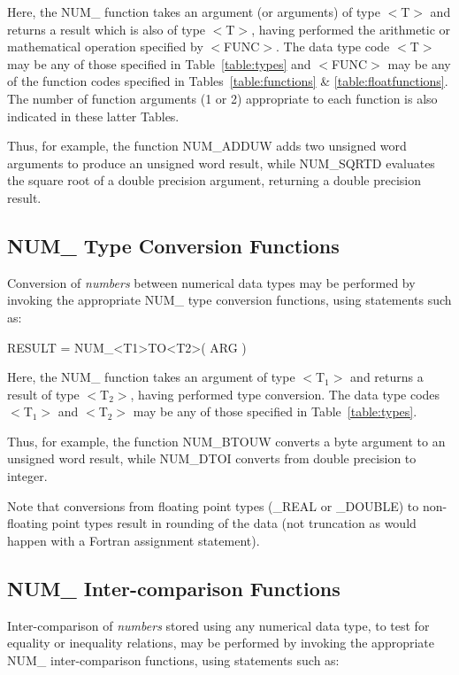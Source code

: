 \documentclass[11pt,nolof]{starlink}
\providecommand{\name}[1]{#1}
\begin{document}
Here, the \name{NUM\_} function takes an argument (or arguments) of type
\name{$<$T$>$} and returns a result which is also of type \name{$<$T$>$},
having performed the arithmetic or mathematical operation specified by
\name{$<$FUNC$>$}.
The data type code \name{$<$T$>$} may be any of those specified in
Table~\ref{table:types} and \name{$<$FUNC$>$} may be any of the function
codes specified in Tables~\ref{table:functions} \&
\ref{table:floatfunctions}.
The number of function arguments (1 or 2) appropriate to each function is
also indicated in these latter Tables.

Thus, for example, the function \name{NUM\_ADDUW} adds two unsigned word
arguments to produce an unsigned word result, while \name{NUM\_SQRTD}
evaluates the square root of a double precision argument, returning a double
precision result.

\subsection{NUM\_ Type Conversion Functions}

Conversion of \emph{numbers} between numerical data types may be performed by
invoking the appropriate \name{NUM\_} type conversion functions, using
statements such as:

\begin{terminalv}
RESULT = NUM_<T1>TO<T2>( ARG )
\end{terminalv}

Here, the \name{NUM\_} function takes an argument of type \name{$<$T$_{1}>$}
and returns a result of type \name{$<$T$_{2}>$}, having performed type
conversion.
The data type codes \name{$<$T$_{1}>$} and \name{$<$T$_{2}>$} may be any of
those specified in Table~\ref{table:types}.

Thus, for example, the function \name{NUM\_BTOUW} converts a byte argument
to an unsigned word result, while \name{NUM\_DTOI} converts from double
precision to integer.

Note that conversions from floating point types (\name{\_REAL} or
\name{\_DOUBLE}) to non-floating point types result in rounding of the data
(not truncation as would happen with a Fortran assignment statement).

\subsection{NUM\_ Inter-comparison Functions}
\label{section:logicals}

Inter-comparison of \emph{numbers} stored using any numerical data type, to
test for equality or inequality relations, may be performed by invoking the
appropriate \name{NUM\_} inter-comparison functions, using statements such as:
\end{document}

